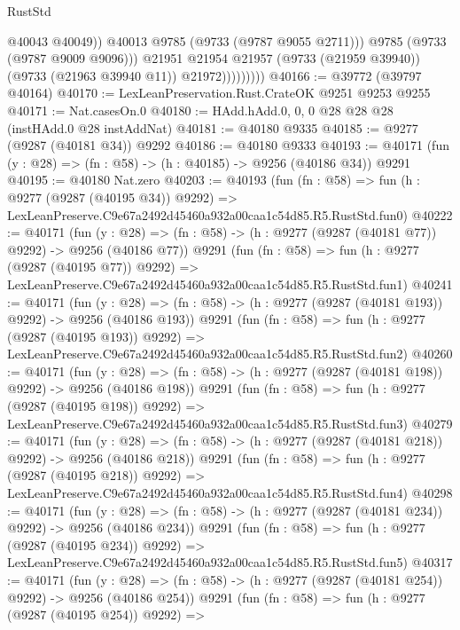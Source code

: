 \begin{lexlean}{RustStd}
\begin{coremodule}
                              @40043
                              @40049))
                          @40013
                          @9785
                          (@9733 (@9787 @9055 @2711)))
                        @9785
                        (@9733 (@9787 @9009 @9096)))
                      @21951
                      @21954
                      @21957
                      (@9733 (@21959 @39940))
                      (@9733 (@21963 @39940 @11))
                      @21972)))))))))
@40166 := @39772 (@39797 @40164)
@40170 := LexLeanPreservation.Rust.CrateOK @9251 @9253 @9255
@40171 := Nat.casesOn.{0}
@40180 := HAdd.hAdd.{0, 0, 0} @28 @28 @28 (instHAdd.{0} @28 instAddNat)
@40181 := @40180 @9335
@40185 := @9277 (@9287 (@40181 @34)) @9292
@40186 := @40180 @9333
@40193 := @40171 (fun (y : @28) => (fn : @58) -> (h : @40185) -> @9256 (@40186 @34)) @9291
@40195 := @40180 Nat.zero
@40203 := @40193
    (fun (fn : @58) =>
    fun (h : @9277 (@9287 (@40195 @34)) @9292) =>
    LexLeanPreserve.C9e67a2492d45460a932a00caa1c54d85.R5.RustStd.fun0)
@40222 := @40171
    (fun (y : @28) => (fn : @58) -> (h : @9277 (@9287 (@40181 @77)) @9292) -> @9256 (@40186 @77))
    @9291
    (fun (fn : @58) =>
    fun (h : @9277 (@9287 (@40195 @77)) @9292) =>
    LexLeanPreserve.C9e67a2492d45460a932a00caa1c54d85.R5.RustStd.fun1)
@40241 := @40171
    (fun (y : @28) => (fn : @58) -> (h : @9277 (@9287 (@40181 @193)) @9292) -> @9256 (@40186 @193))
    @9291
    (fun (fn : @58) =>
    fun (h : @9277 (@9287 (@40195 @193)) @9292) =>
    LexLeanPreserve.C9e67a2492d45460a932a00caa1c54d85.R5.RustStd.fun2)
@40260 := @40171
    (fun (y : @28) => (fn : @58) -> (h : @9277 (@9287 (@40181 @198)) @9292) -> @9256 (@40186 @198))
    @9291
    (fun (fn : @58) =>
    fun (h : @9277 (@9287 (@40195 @198)) @9292) =>
    LexLeanPreserve.C9e67a2492d45460a932a00caa1c54d85.R5.RustStd.fun3)
@40279 := @40171
    (fun (y : @28) => (fn : @58) -> (h : @9277 (@9287 (@40181 @218)) @9292) -> @9256 (@40186 @218))
    @9291
    (fun (fn : @58) =>
    fun (h : @9277 (@9287 (@40195 @218)) @9292) =>
    LexLeanPreserve.C9e67a2492d45460a932a00caa1c54d85.R5.RustStd.fun4)
@40298 := @40171
    (fun (y : @28) => (fn : @58) -> (h : @9277 (@9287 (@40181 @234)) @9292) -> @9256 (@40186 @234))
    @9291
    (fun (fn : @58) =>
    fun (h : @9277 (@9287 (@40195 @234)) @9292) =>
    LexLeanPreserve.C9e67a2492d45460a932a00caa1c54d85.R5.RustStd.fun5)
@40317 := @40171
    (fun (y : @28) => (fn : @58) -> (h : @9277 (@9287 (@40181 @254)) @9292) -> @9256 (@40186 @254))
    @9291
    (fun (fn : @58) =>
    fun (h : @9277 (@9287 (@40195 @254)) @9292) =>

\end{coremodule}
\end{lexlean}
